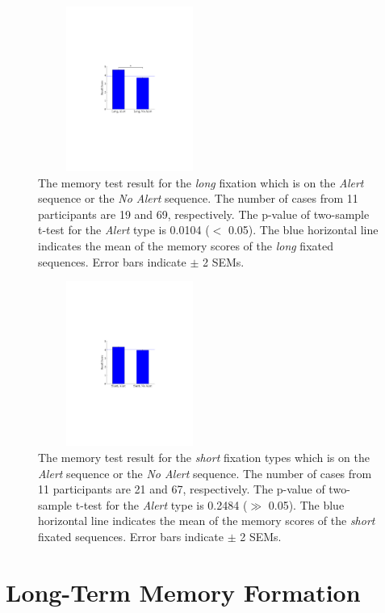 \documentclass[10pt,letterpaper]{article}
\begin{document}
\begin{figure}
  \centerline{\includegraphics[width=60mm,height=54mm,trim=65mm 103mm 68mm 100mm]{./eps/memtest_long.pdf}}
  \caption{The memory test result for the \textit{long} fixation which is on the \textit{Alert} sequence or the \textit{No Alert} sequence. The number of cases from 11 participants are 19 and 69, respectively. The p-value of two-sample t-test for the \textit{Alert} type is 0.0104 ($<$ 0.05). The blue horizontal line indicates the mean of the memory scores of the \textit{long} fixated sequences. Error bars indicate $\pm$ 2 SEMs.}
  \label{fig:memtest-long}
\end{figure}

\begin{figure}
  \centerline{\includegraphics[width=60mm,height=54mm,trim=65mm 103mm 68mm 100mm]{./eps/memtest_short.pdf}}
  \caption{The memory test result for the \textit{short} fixation types which is on the \textit{Alert} sequence or the \textit{No Alert} sequence. The number of cases from 11 participants are 21 and 67, respectively. The p-value of two-sample t-test for the \textit{Alert} type is 0.2484 ($\gg$ 0.05). The blue horizontal line indicates the mean of the memory scores of the \textit{short} fixated sequences. Error bars indicate $\pm$ 2 SEMs.}
  \label{fig:memtest-short}
\end{figure}


\section{Long-Term Memory Formation}
\end{document}

